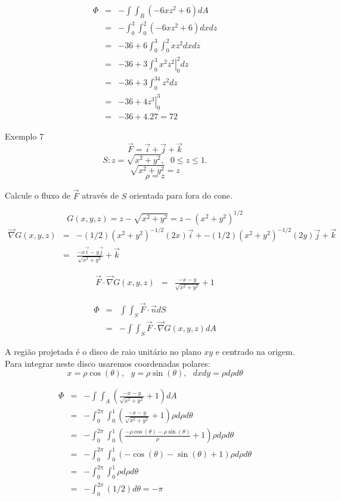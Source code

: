 \documentclass[a4paper,10pt]{book}
\begin{document}
\begin{eqnarray*}
\Phi&=&-\int\int_R (-6xz^2+6)dA\\
&=&-\int_0^3\int_0^2 (-6xz^2+6)dxdz\\
&=&-36+6\int_0^3\int_0^2xz^2dxdz\\
&=&-36+3\int_0^3\left.x^2z^2\right|_0^2 dz\\
&=&-36+3\int_0^34z^2dz\\
&=&-36+4\left. z^3\right|_0^3\\
&=&-36+4.27=72
\end{eqnarray*}

Exemplo 7 $$\vec{F}=\vec{i}+\vec{j}+\vec{k}$$
$$S:z=\sqrt{x^2+y^2},~~~  0\leq z\leq 1.$$
$$\sqrt{x^2+y^2}=z$$
$$\rho=z$$

Calcule o fluxo de $\vec{F}$ através de $S$ orientada para fora do cone.

$$G(x,y,z)=z-\sqrt{x^2+y^2}=z-(x^2+y^2)^{1/2}$$
\begin{eqnarray*}
\vec{\nabla}G(x,y,z)&=&-(1/2)(x^2+y^2)^{-1/2}(2x)\vec{i}+-(1/2)(x^2+y^2)^{-1/2}(2y)\vec{j}+\vec{k} \\
&=&\frac{-x\vec{i}-y\vec{j}}{\sqrt{x^2+y^2}}+\vec{k}
\end{eqnarray*}


\begin{eqnarray*}
\vec{F}\cdot \vec{\nabla}G(x,y,z)&=&\frac{-x-y}{\sqrt{x^2+y^2}}+1
\end{eqnarray*}


\begin{eqnarray*}
\Phi&=&\int\int_S\vec{F}\cdot \vec{n}dS\\&=&- \int\int_S\vec{F}\cdot \vec{\nabla}G(x,y,z)dA 
\end{eqnarray*}

A região projetada é o disco de raio unitário no plano $xy$ e centrado na origem. Para integrar neste disco usaremos coordenadas polares:
$$x=\rho\cos(\theta),~~~y=\rho\sin(\theta),~~~dxdy =\rho d\rho d\theta $$

\begin{eqnarray*}
\Phi&=&- \int\int_A\left(\frac{-x-y}{\sqrt{x^2+y^2}}+1\right)dA \\
&=&- \int_0^{2\pi}\int_0^1\left(\frac{-x-y}{\sqrt{x^2+y^2}}+1\right)\rho d\rho d\theta \\
&=&- \int_0^{2\pi}\int_0^1\left(\frac{-\rho\cos(\theta)-\rho\sin(\theta)}{\rho}+1\right)\rho d\rho d\theta \\
&=&- \int_0^{2\pi}\int_0^1\left({-\cos(\theta)-\sin(\theta)}+1\right)\rho d\rho d\theta \\
&=&- \int_0^{2\pi}\int_0^1\rho d\rho d\theta \\
&=&- \int_0^{2\pi}(1/2) d\theta=-\pi \\
\end{eqnarray*}
\end{document}
